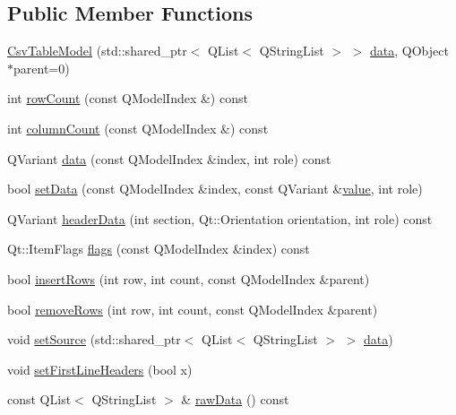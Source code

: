 \subsection*{Public Member Functions}
\begin{DoxyCompactItemize}
\item 
\mbox{\hyperlink{class_csv_table_model_abb394c4ca904ec2b7c658edc57357df4}{Csv\+Table\+Model}} (std\+::shared\+\_\+ptr$<$ Q\+List$<$ Q\+String\+List $>$ $>$ \mbox{\hyperlink{class_csv_table_model_a110efb7633d6ada7e1aa69cd798a0784}{data}}, Q\+Object $\ast$parent=0)
\item 
int \mbox{\hyperlink{class_csv_table_model_a038885f5cef7e7772f3bd1123dbad5b1}{row\+Count}} (const Q\+Model\+Index \&) const
\item 
int \mbox{\hyperlink{class_csv_table_model_a6de6f733dcd74740ffe1f8ddd8090f2b}{column\+Count}} (const Q\+Model\+Index \&) const
\item 
Q\+Variant \mbox{\hyperlink{class_csv_table_model_a110efb7633d6ada7e1aa69cd798a0784}{data}} (const Q\+Model\+Index \&index, int role) const
\item 
bool \mbox{\hyperlink{class_csv_table_model_a4bd4b943a3fba8a0e88fe4ff674758b3}{set\+Data}} (const Q\+Model\+Index \&index, const Q\+Variant \&\mbox{\hyperlink{diffusion_8cpp_a4b41795815d9f3d03abfc739e666d5da}{value}}, int role)
\item 
Q\+Variant \mbox{\hyperlink{class_csv_table_model_abee635d2b7b7695b319d050903e49c1f}{header\+Data}} (int section, Qt\+::\+Orientation orientation, int role) const
\item 
Qt\+::\+Item\+Flags \mbox{\hyperlink{class_csv_table_model_ab7dfc0ee22b0bc5abfe3959f187b848c}{flags}} (const Q\+Model\+Index \&index) const
\item 
bool \mbox{\hyperlink{class_csv_table_model_aca6f3268be19355cfc9ee07bdbe39f61}{insert\+Rows}} (int row, int count, const Q\+Model\+Index \&parent)
\item 
bool \mbox{\hyperlink{class_csv_table_model_a357bdd2240c3a5b1d28ef4fe15d1c753}{remove\+Rows}} (int row, int count, const Q\+Model\+Index \&parent)
\item 
void \mbox{\hyperlink{class_csv_table_model_a9f1e6b63797bb7ec6bbad6e237b4e4b2}{set\+Source}} (std\+::shared\+\_\+ptr$<$ Q\+List$<$ Q\+String\+List $>$ $>$ \mbox{\hyperlink{class_csv_table_model_a110efb7633d6ada7e1aa69cd798a0784}{data}})
\item 
void \mbox{\hyperlink{class_csv_table_model_ae5b4288f87c9cc6e0d1c27ca6f0d3af3}{set\+First\+Line\+Headers}} (bool x)
\item 
const Q\+List$<$ Q\+String\+List $>$ \& \mbox{\hyperlink{class_csv_table_model_acd0b0537f844bccc9092a840adc8543b}{raw\+Data}} () const
\end{DoxyCompactItemize}


